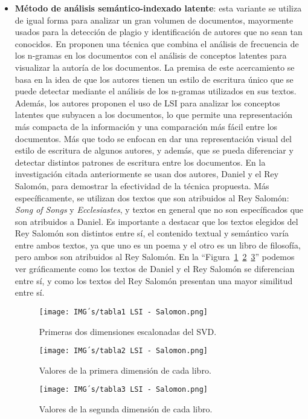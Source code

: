 \documentclass[12pt, conference]{IEEEtran}
\begin{document}
\begin{itemize}
  \item \textbf{Método de análisis semántico-indexado latente}: esta variante se utiliza de igual forma para analizar un gran volumen de documentos, mayormente usados para la detección de plagio y identificación de autores que no sean tan conocidos. En \cite{f10} proponen una técnica que combina el análisis de frecuencia de los n-gramas en los documentos con el análisis de conceptos latentes para visualizar la autoría de los documentos. La premisa de este acercamiento se basa en la idea de que los autores tienen un estilo de escritura único que se puede detectar mediante el análisis de los n-gramas utilizados en sus textos. Además, los autores proponen el uso de LSI para analizar los conceptos latentes que subyacen a los documentos, lo que permite una representación más compacta de la información y una comparación más fácil entre los documentos. Más que todo se enfocan en dar una representación visual del estilo de escritura de algunos autores, y además, que se pueda diferenciar y detectar distintos patrones de escritura entre los documentos. En la investigación citada anteriormente se usan dos autores, Daniel y el Rey Salomón, para demostrar la efectividad de la técnica propuesta. Más específicamente, se utilizan dos textos que son atribuidos al Rey Salomón: \textit{Song of Songs} y \textit{Ecclesiastes}, y textos en general que no son específicados que son atribuidos a Daniel. Es importante a destacar que los textos elegidos del Rey Salomón son distintos entre sí, el contenido textual y semántico varía entre ambos textos, ya que uno es un poema y el otro es un libro de filosofía, pero ambos son atribuidos al Rey Salomón. En la ``Figura~\ref{fig7}~\ref{fig8}~\ref{fig9}'' podemos ver gráficamente como los textos de Daniel y el Rey Salomón se diferencian entre sí, y como los textos del Rey Salomón presentan una mayor similitud entre sí.
  \begin{figure}[htbp]
    \caption{Primeras dos dimensiones escalonadas del SVD.}
    \centerline{\texttt{[image: IMG´s/tabla1 LSI - Salomon.png]}}
    \label{fig7}
  \end{figure}
  \begin{figure}[htbp]
    \caption{Valores de la primera dimensión de cada libro.}
    \centerline{\texttt{[image: IMG´s/tabla2 LSI - Salomon.png]}}
    \label{fig8}
  \end{figure}
  \begin{figure}[htbp]
    \caption{Valores de la segunda dimensión de cada libro.}
    \centerline{\texttt{[image: IMG´s/tabla3 LSI - Salomon.png]}}
    \label{fig9}
  \end{figure}
\end{itemize}
\end{document}
